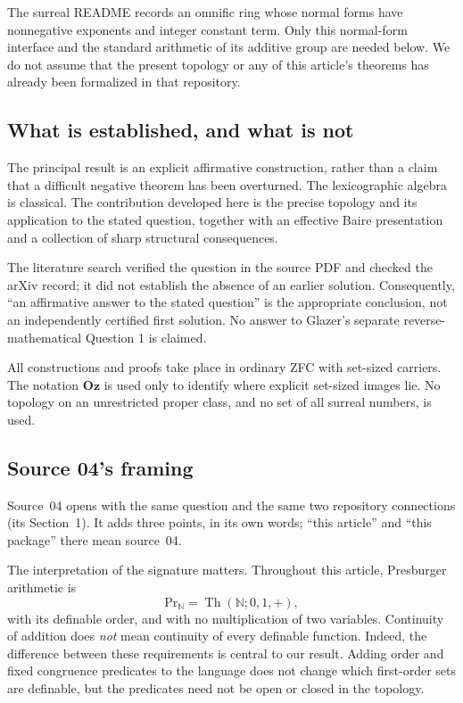 \documentclass[11pt]{article}
\numberwithin{equation}{section}
\theoremstyle{definition}
\theoremstyle{remark}
\newcommand{\N}{\mathbb N}
\newcommand{\Oz}{\mathbf{Oz}}
\newcommand{\Th}{\operatorname{Th}}
\begin{document}
The surreal README \cite{RepoSurreal} records an omnific ring whose normal
forms have nonnegative exponents and integer constant term. Only this
normal-form interface and the standard arithmetic of its additive group
are needed below. We do not assume that the present topology or any of
this article's theorems has already been formalized in that repository.

\subsection{What is established, and what is not}

The principal result is an explicit affirmative construction, rather than
a claim that a difficult negative theorem has been overturned. The
lexicographic algebra is classical. The contribution developed here is
the precise topology and its application to the stated question, together
with an effective Baire presentation and a collection of sharp structural
consequences.

The literature search verified the question in the source PDF and checked
the arXiv record; it did not establish the absence of an earlier solution.
Consequently, ``an affirmative answer to the stated question'' is the
appropriate conclusion, not an independently certified first solution.
No answer to Glazer's separate reverse-mathematical Question 1 is claimed.

All constructions and proofs take place in ordinary ZFC with set-sized
carriers. The notation $\Oz$ is used only to identify where explicit
set-sized images lie. No topology on an unrestricted proper class, and no
set of all surreal numbers, is used.

\subsection{Source 04's framing}\label{pma:pr:sec:introduction}

Source~04 opens with the same question and the same two repository
connections (its Section~1). It adds three points, in its own words; ``this
article'' and ``this package'' there mean source~04.

The interpretation of the signature matters. Throughout this article,
Presburger arithmetic is
\[
 \mathrm{Pr}_{\N}=\Th(\N;0,1,+),
\]
with its definable order, and with no multiplication of two variables.
Continuity of addition does \emph{not} mean continuity of every definable
function. Indeed, the difference between these requirements is central to
our result. Adding order and fixed congruence predicates to the language
does not change which first-order sets are definable, but the predicates
need not be open or closed in the topology.
\end{document}
